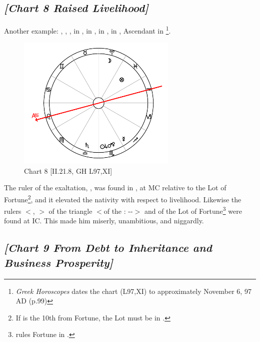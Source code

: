\newpage

\subsection*{\textit{[Chart 8 Raised Livelihood]}}

Another example: \Sun, \Jupiter, \Mars, \Venus in \Scorpio, \Saturn\xspace in \Libra, \Moon\xspace in \Aries, \Mercury\xspace in \Sagittarius, Ascendant in \Leo
\footnote{\textit{Greek Horoscopes} dates the chart (L97,XI) to approximately November 6, 97 AD (p.99)}.

\clearpage
\begin{figure}
\centering
\vspace{-20pt}
\includegraphics[width=0.68\textwidth]{charts/2_21_8}
\caption{Chart 8 [II.21.8, GH L97,XI]}
\label{fig:chart08}
\end{figure}

The ruler of the exaltation, \Mercury, was found in \Sagittarius, at MC relative to the Lot of Fortune\footnote{If \Sagittarius\xspace is the 10th from Fortune, the Lot must be in \Pisces.}, and it elevated the nativity with respect to livelihood. Likewise the rulers $<$\Sun, \Jupiter$>$ of the triangle $<$of the \Sun: \Aries-\Leo-\Sagittarius$>$ and of the Lot of Fortune\footnote{\Jupiter\xspace rules Fortune in \Pisces.} were found at IC. This made him miserly, unambitious, and niggardly.

\newpage
\subsection*{\textit{[Chart 9 From Debt to Inheritance and Business Prosperity]}}
\addcontentsline{toc}{subsection}{\textit{[Chart 9 [GH L95] From Debt to Inheritance and Business Prosperity}}


